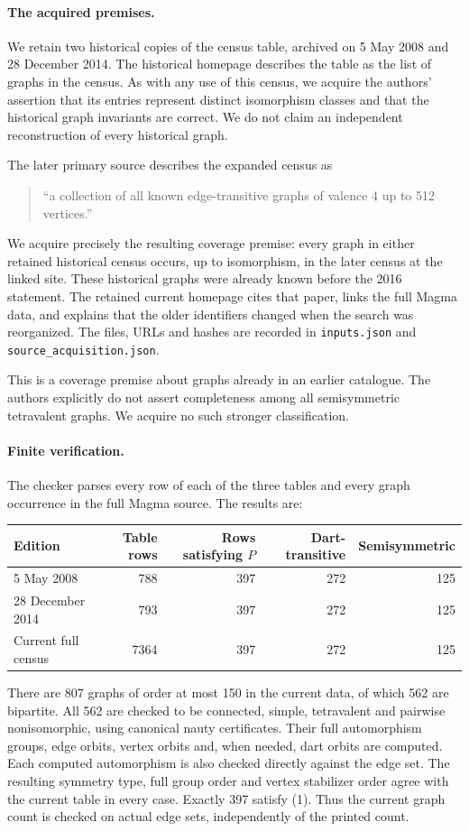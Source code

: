 \documentclass[11pt,a4paper]{article}
\begin{document}
\paragraph{The acquired premises.}
We retain two historical copies of the census table, archived on
5 May 2008 and 28 December 2014. The historical homepage describes
the table as the list of graphs in the census. As with any use of
this census, we acquire the authors' assertion that its entries
represent distinct isomorphism classes and that the historical
graph invariants are correct. We do not claim an independent
reconstruction of every historical graph.

The later primary source \cite[\S1, physical p.~2]{recipes} describes
the expanded census as
\begin{quote}
``a collection of all known edge-transitive graphs of valence 4
up to 512 vertices.''
\end{quote}
We acquire precisely the resulting coverage premise: every graph
in either retained historical census occurs, up to isomorphism,
in the later census at the linked site. These historical graphs
were already known before the 2016 statement. The retained current
homepage cites that paper, links the full Magma data, and explains
that the older identifiers changed when the search was reorganized.
The files, URLs and hashes are recorded in \texttt{inputs.json} and
\texttt{source\_acquisition.json}.

This is a coverage premise about graphs already in an earlier
catalogue. The authors explicitly do not assert completeness among
all semisymmetric tetravalent graphs. We acquire no such stronger
classification.

\paragraph{Finite verification.}
The checker parses every row of each of the three tables and every
graph occurrence in the full Magma source. The results are:
\begin{center}
\begin{tabular}{lrrrr}
\toprule
Edition & Table rows & Rows satisfying $P$ & Dart-transitive & Semisymmetric\\
\midrule
5 May 2008 & 788 & 397 & 272 & 125\\
28 December 2014 & 793 & 397 & 272 & 125\\
Current full census & 7364 & 397 & 272 & 125\\
\bottomrule
\end{tabular}
\end{center}
There are 807 graphs of order at most 150 in the current data,
of which 562 are bipartite. All 562 are checked to be connected,
simple, tetravalent and pairwise nonisomorphic, using canonical
nauty certificates. Their full automorphism groups, edge orbits,
vertex orbits and, when needed, dart orbits are computed. Each
computed automorphism is also checked directly against the edge
set. The resulting symmetry type, full group order and vertex
stabilizer order agree with the current table in every case.
Exactly 397 satisfy (1). Thus the current graph count is checked
on actual edge sets, independently of the printed count.
\end{document}
